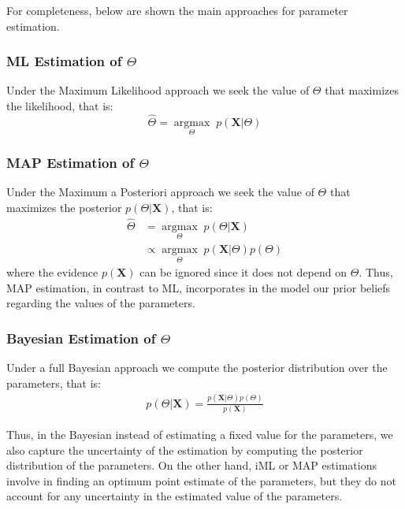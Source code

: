 For completeness, below are shown the main approaches for parameter estimation.

\subsubsection*{ML Estimation of $\Theta$}
Under the Maximum Likelihood approach we seek the value of $\Theta$ that maximizes the likelihood, that is:
\begin{equation} \label{MLE-f-bayes}
	\hat{\Theta} =  \underset{\Theta}{\operatorname{argmax}} \; p(\mathbf{X}|\Theta)
\end{equation}

\subsubsection*{MAP Estimation of $\Theta$}
Under the Maximum a Posteriori approach we seek the value of $\Theta$ that maximizes the posterior $p(\Theta | \mathbf{X})$, that is:
\begin{equation} \label{MAP-f-bayes}
  \begin{aligned}
	\hat{\Theta} & =  \underset{\Theta}{\operatorname{argmax}} \; p(\Theta | \mathbf{X}) \\
	& \propto \underset{\Theta}{\operatorname{argmax}} \; p(\mathbf{X}|\Theta) p(\Theta)
  \end{aligned}
\end{equation}
where the evidence $p(\mathbf{X})$ can be ignored since it does not depend on $\Theta$. Thus, MAP estimation, in contrast to ML, incorporates in the model our prior beliefs regarding the values of the parameters.

\subsubsection*{Bayesian Estimation of $\Theta$}
Under a full Bayesian approach we compute the posterior distribution over the parameters, that is:
\begin{equation} \label{posterio-f-bayes}
  \begin{aligned}
	p(\Theta | \mathbf{X}) = \frac{p(\mathbf{X}|\Theta) p(\Theta)}{p(\mathbf{X})} 
  \end{aligned}
\end{equation}

Thus, in the Bayesian  instead of estimating a fixed value for the parameters, we also capture the uncertainty of the estimation by computing the posterior distribution of the parameters. On the other hand, i\eg ML or MAP estimations involve in finding an optimum point estimate of the parameters, but they do not account for any uncertainty in the estimated value of the parameters. 

